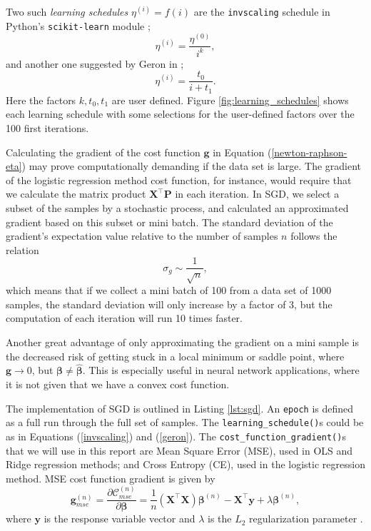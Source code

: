 \documentclass[]{article}
\begin{document}
Two such \textit{learning schedules} $\eta^{(i)} = f(i)$ are the \lstinline|invscaling| schedule in Python's \lstinline|scikit-learn| module \cite{skl};
\begin{equation} \label{invscaling}
	\eta^{(i)} = \frac{\eta^{(0)}}{i^k},
\end{equation}
and another one suggested by Geron in \cite{geron2019hands};
\begin{equation} \label{geron}
	\eta^{(i)} = \frac{t_0}{i + t_1}.
\end{equation}
Here the factors $k, t_0, t_1$ are user defined. Figure \ref{fig:learning_schedules} shows each learning schedule with some selections for the user-defined factors over the 100 first iterations.

Calculating the gradient of the cost function $\mathbf{g}$ in Equation (\ref{newton-raphson-eta}) may prove computationally demanding if the data set is large. The gradient of the logistic regression method cost function, for instance, would require that we calculate the matrix product $\mathbf{X}^\intercal \mathbf{P}$ in each iteration. In SGD, we select a subset of the samples by a stochastic process, and calculated an approximated gradient based on this subset or mini batch. The standard deviation of the gradient's expectation value relative to the number of samples $n$ follows the relation \cite{fys-stk4155-notes}
\begin{equation}
	\sigma_g \sim \frac{1}{\sqrt{n}},
\end{equation}
which means that if we collect a mini batch of 100 from a data set of 1000 samples, the standard deviation will only increase by a factor of 3, but the computation of each iteration will run 10 times faster.

Another great advantage of only approximating the gradient on a mini sample is the decreased risk of getting stuck in a local minimum or saddle point, where $\mathbf{g} \rightarrow 0$, but $\mathbf{\beta} \neq \mathbf{\hat{\beta}}$. This is especially useful in neural network applications, where it is not given that we have a convex cost function.

The implementation of SGD is outlined in Listing \ref{lst:sgd}. An \lstinline|epoch| is defined as a full run through the full set of samples. The \lstinline|learning_schedule()|s could be as in Equations (\ref{invscaling}) and (\ref{geron}). The \lstinline|cost_function_gradient()|s that we will use in this report are Mean Square Error (MSE), used in OLS and Ridge regression methods; and Cross Entropy (CE), used in the logistic regression method. MSE cost function gradient is given by
\begin{equation} \label{cost-mse}
	\mathbf{g}_{mse}^{(n)} = \frac{\partial \mathcal{C}_{mse}^{(n)}}{\partial \mathbf{\beta}} = \frac{1}{n} (\mathbf{X}^\intercal \mathbf{X}) \mathbf{\beta}^{(n)} - \mathbf{X}^\intercal \mathbf{y} + \lambda \mathbf{\beta}^{(n)},
\end{equation}
where $\mathbf{y}$ is the response variable vector and $\lambda$ is the $L_2$ regularization parameter \cite{project1}. 
\end{document}

